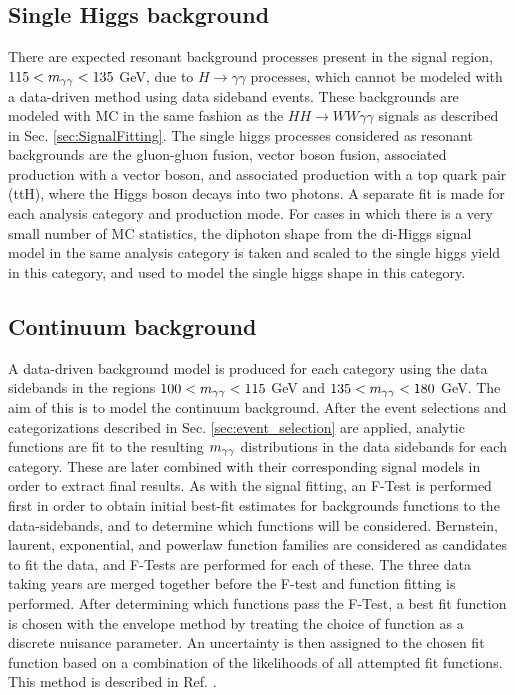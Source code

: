 \subsection{Single Higgs background}

There are expected resonant background processes present in the signal region, $115 < m_{\gamma\gamma} < 135$ GeV, due to $H\rightarrow\gamma\gamma$ processes, which cannot be modeled with a data-driven
method using data sideband events. These backgrounds are modeled with MC in the same fashion as the $HH\rightarrow WW\gamma\gamma$ signals as described in Sec. \ref{sec:SignalFitting}. The single higgs
processes considered as resonant backgrounds are the gluon-gluon fusion, vector boson fusion, associated production with a vector boson, and associated production with a top quark pair (ttH), where the Higgs boson decays 
into two photons. A separate fit is made for each analysis category and production mode. For cases in which there is a very small number of MC statistics, the diphoton shape from 
the di-Higgs signal model in the same analysis category is taken and scaled to the single higgs yield in this category, and used to model the single higgs shape in this category. 

\subsection{Continuum background}
\label{sec:AnalyticFitting_Background}

A data-driven background model is produced for each category using the data sidebands in the regions $100 < m_{\gamma\gamma} < 115$ GeV and $135 < m_{\gamma\gamma} < 180$ GeV.
The aim of this is to model the continuum background.
After the event selections and categorizations described in Sec. \ref{sec:event_selection} are applied, analytic functions are fit to the resulting $m_{\gamma\gamma}$ distributions in the data sidebands for each category.
These are later combined with their corresponding signal models in order to extract final results.
As with the signal fitting, an F-Test is performed first in order to obtain initial best-fit estimates for backgrounds functions to the data-sidebands, and to determine which functions will be considered.
Bernstein, laurent, exponential, and powerlaw function families are considered as
candidates to fit the data, and F-Tests are performed for each of these. The three data taking years are merged together before the F-test and function fitting is performed. 
After determining which functions pass the F-Test, a best fit function is chosen with the envelope method by treating the choice of function as a discrete nuisance parameter.
An uncertainty is then assigned to the chosen fit function based on a combination of the likelihoods of all attempted fit functions. This method is described in
Ref. \cite{Dauncey_2015}.

